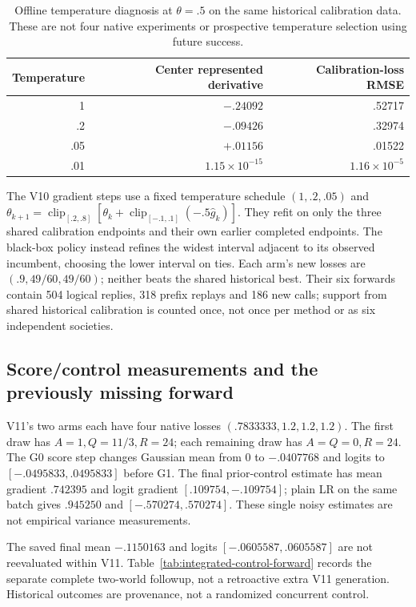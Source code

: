 \begin{table}[h]\centering\small
\caption{Offline temperature diagnosis at $\theta=.5$ on the same historical
calibration data. These are not four native experiments or prospective
temperature selection using future success.}
\label{tab:integrated-temperature}
\begin{tabular}{rrr}\toprule
Temperature & Center represented derivative & Calibration-loss RMSE\\\midrule
1&$-.24092$&.52717\\
.2&$-.09426$&.32974\\
.05&$+.01156$&.01522\\
.01&$1.15\times 10^{-15}$&$1.16\times 10^{-5}$\\\bottomrule
\end{tabular}\end{table}

The V10 gradient steps use a fixed temperature schedule $(1,.2,.05)$ and
$\theta_{k+1}=\operatorname{clip}_{[.2,.8]}[\theta_k+
\operatorname{clip}_{[-.1,.1]}(-.5\widehat g_k)]$.
They refit on only the three shared calibration endpoints and their own earlier
completed endpoints. The black-box policy instead refines the widest interval
adjacent to its observed incumbent, choosing the lower interval on ties.
Each arm's new losses are $(.9, 49/60, 49/60)$; neither beats the shared historical
best. Their six forwards contain 504 logical replies, 318 prefix replays and 186
new calls; support from shared historical calibration is counted once, not once
per method or as six independent societies.

\subsection{Score/control measurements and the previously missing forward}
V11's two arms each have four native losses $(.7833333, 1.2, 1.2, 1.2)$.
The first draw has $A=1,Q=11/3,R=24$; each remaining draw has $A=Q=0,R=24$.
The G0 score step changes Gaussian mean from 0 to $-.0407768$ and logits to
$[-.0495833,.0495833]$ before G1. The final prior-control estimate has mean
gradient $.742395$ and logit gradient $[.109754,-.109754]$; plain LR on the same
batch gives $.945250$ and $[-.570274,.570274]$. These single noisy estimates
are not empirical variance measurements.

The saved final mean $-.1150163$ and logits $[-.0605587,.0605587]$ are not
reevaluated within V11. Table~\ref{tab:integrated-control-forward} records the
separate complete two-world followup, not a retroactive extra V11 generation.
Historical outcomes are provenance, not a randomized concurrent control.

